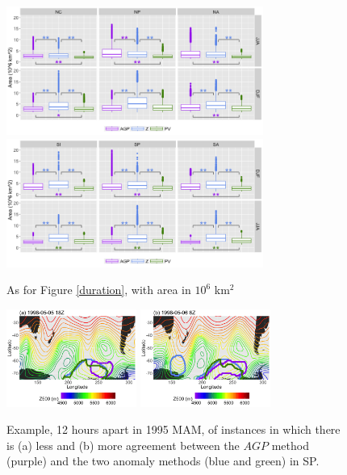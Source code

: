 \documentclass[smallextended]{svjour3}       %
\numberwithin{equation}{section}
\begin{document}
\begin{figure}
    \centering
    \includegraphics[width=0.75\textwidth]{fig_area_NH.png}
    \includegraphics[width=0.75\textwidth]{fig_area_SH.png}
    \caption{As for Figure \ref{duration}, with area in $10^6$ km$^2$}
    \label{size}
\end{figure} 

\begin{figure}
\centering
\includegraphics[width=0.38\textwidth]{fig7a}
\includegraphics[width=0.38\textwidth]{fig7b}
\caption{Example, 12 hours apart in 1995 MAM, of instances in which there is (a) less and (b) more agreement between the $AGP$ method (purple) and the two anomaly methods (blue and green) in SP.}\label{zgdiff}
\end{figure}
\end{document}
